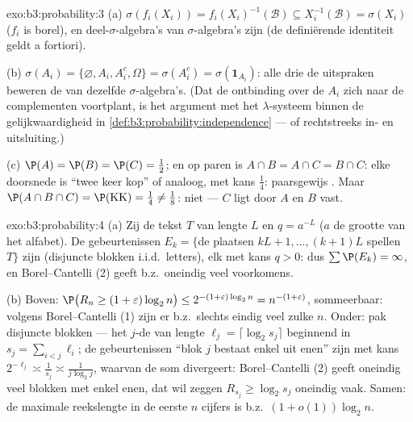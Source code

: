 \begin{solution}{exo:b3:probability:3}
(a) $\sigma(f_i(X_i)) = f_i(X_i)^{-1}(\mathcal B) \subseteq
X_i^{-1}(\mathcal B) = \sigma(X_i)$ ($f_i$ is borel), en
deel-$\sigma$-algebra's van  $\sigma$-algebra's
zijn  (de definiërende identiteit geldt a fortiori).

(b) $\sigma(A_i) = \{\varnothing, A_i, A_i^c, \Omega\} =
\sigma(A_i^c) = \sigma(\mathbf 1_{A_i})$: alle drie de uitspraken
beweren de  van dezelfde $\sigma$-algebra's.
(Dat de ontbinding over de $A_i$ zich naar de complementen
voortplant, is het argument met het $\lambda$-systeem binnen de
gelijkwaardigheid in
\cref{def:b3:probability:independence} --- of rechtstreeks
in- en uitsluiting.)

(c) $\P(A) = \P(B) = \P(C) = \frac12$; en op paren is $A\cap B =
A\cap C = B\cap C$: elke doorsnede is ``twee keer kop'' of
analoog, met kans $\frac14$: paarsgewijs . Maar
$\P(A\cap B\cap C) = \P(\text{KK}) = \frac14 \neq \frac18$: niet
 --- $C$ ligt door $A$ en $B$ vast.
\end{solution}

\begin{solution}{exo:b3:probability:4}
(a) Zij de tekst $T$ van lengte $L$ en $q = a^{-L}$ ($a$ de
grootte van het alfabet). De gebeurtenissen $E_k = \{$de plaatsen
$kL+1, \dots, (k+1)L$ spellen $T\}$ zijn  (disjuncte
blokken i.i.d.\ letters), elk met kans $q > 0$: dus $\sum\P(E_k)
= \infty$, en Borel--Cantelli (2) geeft b.z.\ oneindig veel
voorkomens.

(b) Boven: $\P\bigl(R_n \geq (1+\varepsilon)\log_2n\bigr) \leq
2^{-(1+\varepsilon)\log_2n} = n^{-(1+\varepsilon)}$, sommeerbaar:
volgens Borel--Cantelli (1) zijn er b.z.\ slechts eindig veel
zulke $n$. Onder: pak disjuncte blokken --- het $j$-de van lengte
$\ell_j = \lceil\log_2s_j\rceil$ beginnend in $s_j =
\sum_{i<j}\ell_i$; de gebeurtenissen ``blok $j$ bestaat enkel uit
enen'' zijn  met kans $2^{-\ell_j} \asymp
\frac1{s_j} \asymp \frac1{j\log_2 j}$, waarvan de som divergeert:
Borel--Cantelli (2) geeft oneindig veel blokken met enkel enen,
dat wil zeggen $R_{s_j} \geq \log_2 s_j$ oneindig vaak. Samen: de
maximale reekslengte in de eerste $n$ cijfers is b.z.\ $(1 +
o(1))\log_2n$.
\end{solution}

